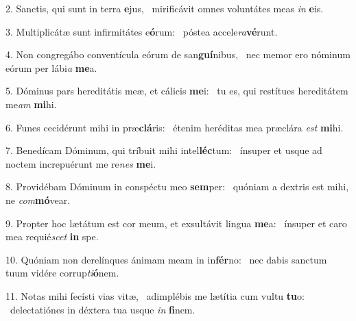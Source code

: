 2. Sanctis, qui sunt in terra \textbf{e}jus, \ast\  mirificávit omnes voluntátes meas \textit{in} \textbf{e}is.\

3. Multiplicátæ sunt infirmitátes e\textbf{ó}rum: \ast\  póstea accele\textit{ra}\textbf{vé}runt.\

4. Non congregábo conventícula eórum de san\textbf{guí}nibus, \ast\  nec memor ero nóminum eórum per lábi\textit{a} \textbf{me}a.\

5. Dóminus pars hereditátis meæ, et cálicis \textbf{me}i: \ast\  tu es, qui restítues hereditátem me\textit{am} \textbf{mi}hi.\

6. Funes cecidérunt mihi in præ\textbf{clá}ris: \ast\  étenim heréditas mea præclára \textit{est} \textbf{mi}hi.\

7. Benedícam Dóminum, qui tríbuit mihi intel\textbf{léc}tum: \ast\  ínsuper et usque ad noctem increpuérunt me re\textit{nes} \textbf{me}i.\

8. Providébam Dóminum in conspéctu meo \textbf{sem}per: \ast\  quóniam a dextris est mihi, ne \textit{com}\textbf{mó}vear.\

9. Propter hoc lætátum est cor meum, et exsultávit lingua \textbf{me}a: \ast\  ínsuper et caro mea requié\textit{scet} \textbf{in} spe.\

10. Quóniam non derelínques ánimam meam in in\textbf{fér}no: \ast\  nec dabis sanctum tuum vidére corrup\textit{ti}\textbf{ó}nem.\

11. Notas mihi fecísti vias vitæ, \dag\  adimplébis me lætítia cum vultu \textbf{tu}o: \ast\  delectatiónes in déxtera tua usque \textit{in} \textbf{fi}nem.\

